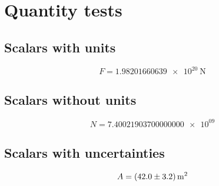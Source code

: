 \documentclass{article}%
\begin{document}
%
\normalsize%
\section{Quantity tests}%
\subsection{Scalars with units}%
\[%
F= \SI[round-mode=figures,round-precision=4]{1.98201660639e+20}{\newton}%
\]

%
\subsection{Scalars without units}%
\[%
N= \num[round-mode=figures,round-precision=2]{7.40021903700000000e+09}%
\]

%
\subsection{Scalars with uncertainties}%
\[%
A= \SI[separate-uncertainty]{42.0 +- 3.2}{\meter\tothe{2}}%
\]

%
\end{document}
